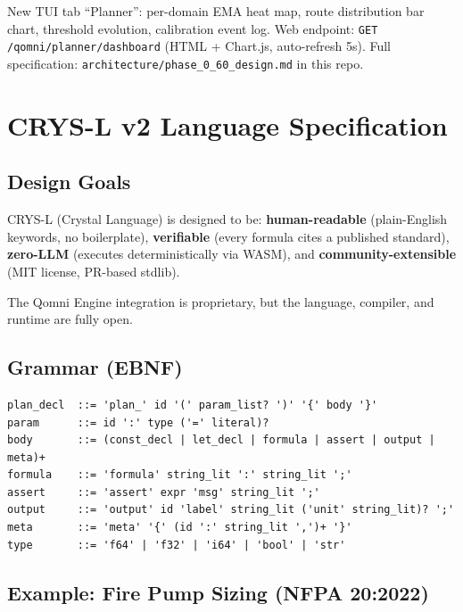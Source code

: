 \documentclass[12pt,a4paper]{article}
\begin{document}
New TUI tab ``Planner'': per-domain EMA heat map, route distribution bar chart,
threshold evolution, calibration event log.
Web endpoint: \texttt{GET /qomni/planner/dashboard} (HTML + Chart.js, auto-refresh 5s).
Full specification: \texttt{architecture/phase\_0\_60\_design.md} in this repo.

\section{CRYS-L v2 Language Specification}
\label{sec:crysl}

\subsection{Design Goals}

CRYS-L (Crystal Language) is designed to be:
\textbf{human-readable} (plain-English keywords, no boilerplate),
\textbf{verifiable} (every formula cites a published standard),
\textbf{zero-LLM} (executes deterministically via WASM), and
\textbf{community-extensible} (MIT license, PR-based stdlib).

The Qomni Engine integration is proprietary, but the language,
compiler, and runtime are fully open.

\subsection{Grammar (EBNF)}

\begin{lstlisting}[caption=CRYS-L v2 grammar (EBNF excerpt)]
plan_decl  ::= 'plan_' id '(' param_list? ')' '{' body '}'
param      ::= id ':' type ('=' literal)?
body       ::= (const_decl | let_decl | formula | assert | output | meta)+
formula    ::= 'formula' string_lit ':' string_lit ';'
assert     ::= 'assert' expr 'msg' string_lit ';'
output     ::= 'output' id 'label' string_lit ('unit' string_lit)? ';'
meta       ::= 'meta' '{' (id ':' string_lit ',')+ '}'
type       ::= 'f64' | 'f32' | 'i64' | 'bool' | 'str'
\end{lstlisting}

\subsection{Example: Fire Pump Sizing (NFPA 20:2022)}
\end{document}
